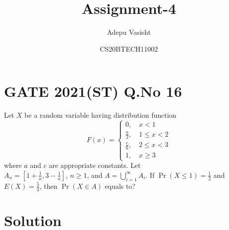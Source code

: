 \documentclass[journal,12pt,twocolumn]{IEEEtran}
\title{Assignment-4}
\author{Adepu Vasisht}
\date{CS20BTECH11002}
\providecommand{\brak}[1]{\ensuremath{\left(#1\right)}}
\begin{document}
\maketitle
\section*{GATE 2021(ST) Q.No 16}
Let $X$ be a random variable having distribution function 
\begin{equation}
\nonumber F(x)=
\begin{cases}
0, \quad x<1\\
\frac{a}{2}, \quad  1\leq x<2\\
\frac{c}{6}, \quad 2\leq x<3\\
1, \quad x\geq3
\end{cases}
\end{equation}
where $a$ and $c$ are appropriate constants. Let\\$A_n = \left[1+\frac{1}{n},3-\frac{1}{n}\right]$, $n\geq1$, and $A = \bigcup_{i=1}^{\infty}A_i$. If $\Pr\brak{X\leq1} = \frac{1}{2}$ and $E\brak{X} = \frac{5}{3}$, then $\Pr\brak{X\in A}$ equals to?

\section*{Solution}
\end{document}
